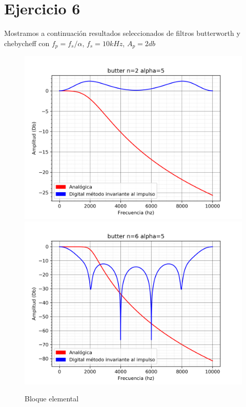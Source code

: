 \documentclass[assd_tp3_main.tex]{subfiles}
\begin{document}
\section*{Ejercicio 6}

Mostramos a continuación resultados seleccionados de filtros butterworth y chebycheff con
$f_p=f_s/\alpha$, $f_s=10kHz$, $A_p=2db$

\begin{figure}[H]	
	\centering
	\includegraphics[scale=1]{output/butter/alpha=5/butter_n=2.png}
	\includegraphics[scale=1]{output/butter/alpha=5/butter_n=6.png}
	\caption{Bloque elemental}
	\label{fig:bloqueElemental}
\end{figure}
\end{document}
